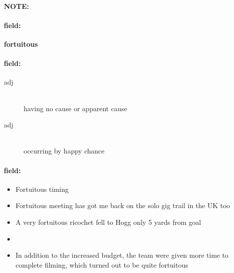 \documentclass[12pt]{article}
\newenvironment{note}{\paragraph{NOTE:}}{}
\newenvironment{field}{\paragraph{field:}}{}
\begin{document}
\begin{note}
\begin{field}
\textbf{\large fortuitous}
\end{field}


\begin{field}
\begin{description}
\item[adj] \hfill \\ 
having no cause or apparent cause

\item[adj] \hfill \\ 
occurring by happy chance

\end{description}
\end{field}

\begin{field}
\begin{itemize}
\item Fortuitous timing
\item Fortuitous meeting has got me back on the solo gig trail in the UK too
\item A very fortuitous ricochet fell to Hogg only 5 yards from goal
\item 
\item In addition to the increased budget, the team were given more time to complete filming, which turned out to be quite fortuitous
\end{itemize}
\end{field}
\end{note}
\end{document}
